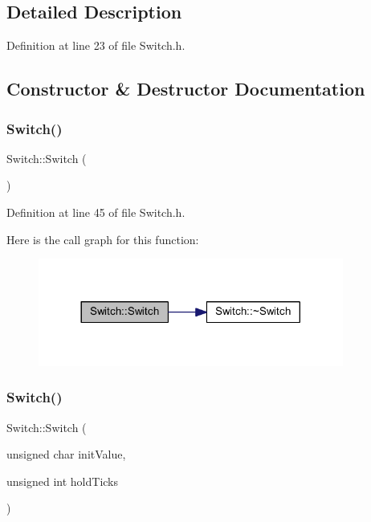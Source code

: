 \subsection{Detailed Description}


Definition at line 23 of file Switch.\+h.



\subsection{Constructor \& Destructor Documentation}
\mbox{\label{class_switch_a54db96db46113c6a4904553796d183ce}} 
\subsubsection{\texorpdfstring{Switch()}{Switch()}\hspace{0.1cm}{\footnotesize\ttfamily [1/3]}}
{\footnotesize\ttfamily Switch\+::\+Switch (\begin{DoxyParamCaption}{ }\end{DoxyParamCaption})\hspace{0.3cm}{\ttfamily [inline]}}



Definition at line 45 of file Switch.\+h.

Here is the call graph for this function\+:
\nopagebreak
\begin{figure}[H]
\begin{center}
\leavevmode
\includegraphics[width=284pt]{class_switch_a54db96db46113c6a4904553796d183ce_cgraph}
\end{center}
\end{figure}
\mbox{\label{class_switch_a44465bb81ffe5495c856653dde8fce95}} 
\subsubsection{\texorpdfstring{Switch()}{Switch()}\hspace{0.1cm}{\footnotesize\ttfamily [2/3]}}
{\footnotesize\ttfamily Switch\+::\+Switch (\begin{DoxyParamCaption}\item[{unsigned char}]{init\+Value,  }\item[{unsigned int}]{hold\+Ticks }\end{DoxyParamCaption})}




